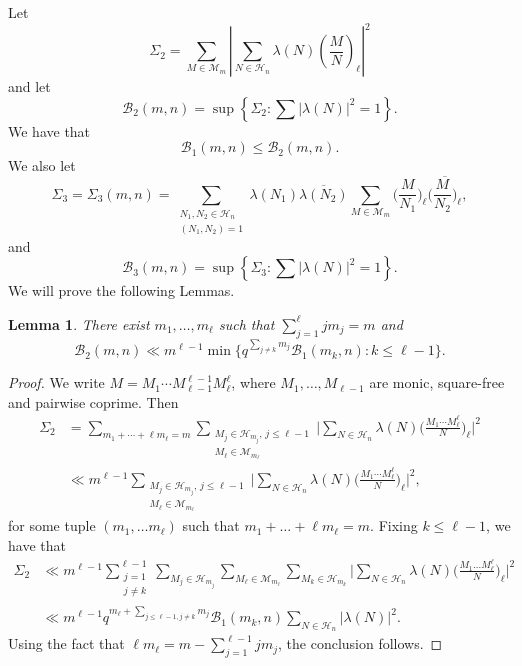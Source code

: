 \documentclass[12pt]{amsart}
\newtheorem{lemma}[theorem]{Lemma}
\def\cH{\mathcal{H}}
\def\cH{\mathcal{H}}
\def\cM{\mathcal{M}}
\newcommand{\legl}[2]{\left( \frac{#1}{#2} \right)_\ell}
\begin{document}
Let
$$ \Sigma_2 = \sum_{M \in \mathcal{M}_m}  \left| \sum_{N \in \cH_n} \lambda(N) \legl{M}{N} \right|^2$$
and let
$$\mathcal{B}_2(m,n) = \sup \left\{  \Sigma_2 : \sum |\lambda(N)|^2=1\right\}.$$
We have that 
\begin{equation} \mathcal{B}_1(m,n) \leq \mathcal{B}_2(m,n).
\label{b12}
\end{equation}
We also let
$$\Sigma_3 = \Sigma_3(m,n) = \sum_{\substack{N_1, N_2 \in \mathcal{H}_n \\ (N_1,N_2)=1}} \lambda(N_1) \overline{\lambda(N_2)} \sum_{M \in \mathcal{M}_m}  \Big(  \frac{M}{N_1} \Big)_{\ell} \overline{ \Big(  \frac{M}{N_2} \Big)_{\ell}},$$
and $$\mathcal{B}_3(m,n) = \sup \left\{  \Sigma_3 : \sum |\lambda(N)|^2=1\right\}.$$
We will prove the following Lemmas. 
\begin{lemma}
\label{lem6}
There exist $m_1, \ldots, m_{\ell}$ such that $\sum_{j=1}^{\ell} j m_j = m$ and
$$\mathcal{B}_2(m,n) \ll m^{\ell-1}  \min \Big\{q^{\sum_{ j \neq k} m_j} \mathcal{B}_1(m_k,n) : k \leq \ell-1  \Big\}.$$
\end{lemma} 
\begin{proof}
We write $M= M_1 \cdots M_{\ell-1}^{\ell-1} M_{\ell}^{\ell}$, where $M_1, \ldots, M_{\ell-1}$ are monic, square-free and pairwise coprime. Then
\begin{align*}
\Sigma_2 &= \sum_{m_1+\cdots +\ell m_{\ell}=m} \sum_{\substack{M_j \in \cH_{m_j},\, j\leq \ell-1 \\ M_{\ell} \in \cM_{m_{\ell}}}} \Big| \sum_{N \in \cH_n} \lambda(N) \Big( \frac{M_1 \cdots M_{\ell}^{\ell}}{N} \Big)_{\ell} \Big|^2 \\
& \ll m^{\ell-1} \sum_{\substack{M_j \in \cH_{m_j},\, j\leq \ell-1 \\ M_{\ell} \in \cM_{m_{\ell}}}} \Big| \sum_{N \in \cH_n} \lambda(N) \Big( \frac{M_1 \cdots M_{\ell}^{\ell}}{N} \Big)_{\ell} \Big|^2,
\end{align*}
for some tuple $(m_1,\ldots m_{\ell})$ such that $m_1+\ldots+\ell m_{\ell}=m$. Fixing $k\leq \ell-1$, we have that
\begin{align*}
\Sigma_2 &\ll m^{\ell-1} \sum_{\substack{j=1 \\ j \neq k}}^{\ell-1} \sum_{M_j \in \cH_{m_j}} \sum_{M_{\ell} \in \cM_{m_{\ell}}} \sum_{M_k \in \cH_{m_k}} \Big| \sum_{N \in \cH_n} \lambda(N) \Big( \frac{M_1 \ldots M_{\ell}^{\ell}}{N} \Big)_{\ell} \Big|^2 \\
& \ll m^{\ell-1} q^{m_{\ell} + \sum_{j \leq \ell-1, j \neq k} m_j} \mathcal{B}_1(m_k,n) \sum_{N \in \cH_n} |\lambda(N)|^2.
\end{align*}
Using the fact that $\ell m_{\ell} = m- \sum_{j=1}^{\ell-1} j m_j$, the conclusion follows.
\end{proof}
\end{document}
